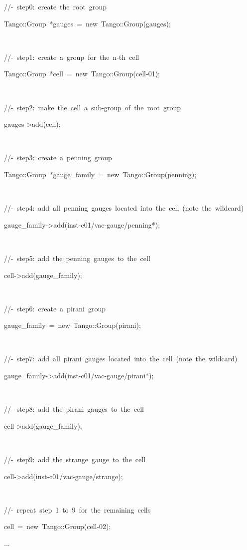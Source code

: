 
\begin{lyxcode}
//-~step0:~create~the~root~group~

Tango::Group~{*}gauges~=~new~Tango::Group(\textquotedbl{}gauges\textquotedbl{});

~

//-~step1:~create~a~group~for~the~n-th~cell

Tango::Group~{*}cell~=~new~Tango::Group(\textquotedbl{}cell-01\textquotedbl{});

~

//-~step2:~make~the~cell~a~sub-group~of~the~root~group~

gauges->add(cell);

~

//-~step3:~create~a~\textquotedbl{}penning\textquotedbl{}~group~

Tango::Group~{*}gauge\_family~=~new~Tango::Group(\textquotedbl{}penning\textquotedbl{});

~

//-~step4:~add~all~penning~gauges~located~into~the~cell~(note~the~wildcard)

gauge\_family->add(\textquotedbl{}inst-c01/vac-gauge/penning{*}\textquotedbl{});

~

//-~step5:~add~the~penning~gauges~to~the~cell

cell->add(gauge\_family);

~

//-~step6:~create~a~\textquotedbl{}pirani\textquotedbl{}~group~

gauge\_family~=~new~Tango::Group(\textquotedbl{}pirani\textquotedbl{});

~

//-~step7:~add~all~pirani~gauges~located~into~the~cell~(note~the~wildcard)

gauge\_family->add(\textquotedbl{}inst-c01/vac-gauge/pirani{*}\textquotedbl{});

~

//-~step8:~add~the~pirani~gauges~to~the~cell

cell->add(gauge\_family);

~

//-~step9:~add~the~\textquotedbl{}strange\textquotedbl{}~gauge~to~the~cell

cell->add(\textquotedbl{}inst-c01/vac-gauge/strange\textquotedbl{});

~

//-~repeat~step~1~to~9~for~the~remaining~cells

cell~=~new~Tango::Group(\textquotedbl{}cell-02\textquotedbl{});

...
\end{lyxcode}
 

